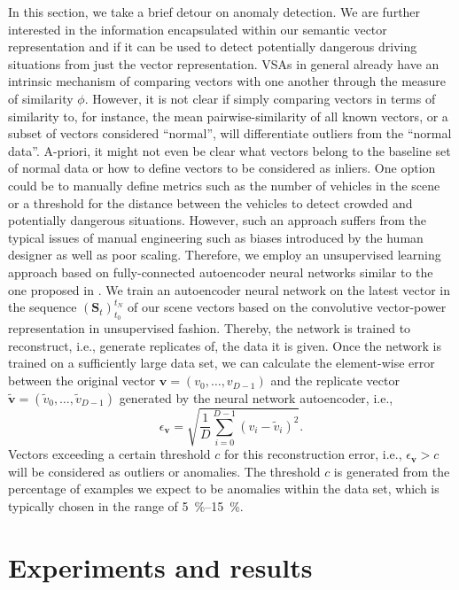 In this section, we take a brief detour on anomaly detection.
We are further interested in the information encapsulated within our semantic vector representation and if it can be used to detect potentially dangerous driving situations from just the vector representation.
\acp{VSA} in general already have an intrinsic mechanism of comparing vectors with one another through the measure of similarity $\phi$.
However, it is not clear if simply comparing vectors in terms of similarity to, for instance, the mean pairwise-similarity of all known vectors, or a subset of vectors considered \enquote{normal}, will differentiate outliers from the \enquote{normal data}.
A-priori, it might not even be clear what vectors belong to the baseline set of normal data or how to define vectors to be considered as inliers.
One option could be to manually define metrics such as the number of vehicles in the scene or a threshold for the distance between the vehicles to detect crowded and potentially dangerous situations.
However, such an approach suffers from the typical issues of manual engineering such as biases introduced by the human designer as well as poor scaling.
Therefore, we employ an unsupervised learning approach based on fully-connected autoencoder neural networks similar to the one proposed in \textcite{Chen2017}.
We train an autoencoder neural network on the latest vector in the sequence $(\mathbf{S}_{t})_{t_0}^{t_N}$ of our scene vectors based on the convolutive vector-power representation in unsupervised fashion.
Thereby, the network is trained to reconstruct, i.e., generate replicates of, the data it is given.
Once the network is trained on a sufficiently large data set, we can calculate the element-wise error between the original vector $ \mathbf{v} = \left(v_{0}, \ldots, v_{D-1}\right)$ and the replicate vector $ \tilde{\mathbf{v}} = \left(\tilde{v}_{0}, \ldots, \tilde{v}_{D-1}\right)$ generated by the neural network autoencoder, i.e.,
\begin{equation}
\label{eq:anom_error}
\epsilon_{ \mathbf{v}} = \sqrt{ \frac{1}{D} \sum\limits_{i=0}^{D-1} \left(v_{i} - \tilde{v}_{i}\right)^{2}}.
\end{equation}
Vectors exceeding a certain threshold $c$ for this reconstruction error, i.e., $\epsilon_{ \mathbf{v}} > c$ will be considered as outliers or anomalies.
The threshold $c$ is generated from the percentage of examples we expect to be anomalies within the data set, which is typically chosen in the range of \SIrange{5}{15}{\percent}.

\section{Experiments and results}
\label{sec:experiments}

